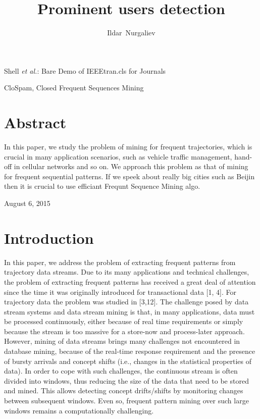 \documentclass[journal]{IEEEtran}
\begin{document}
\title{Prominent users detection}

\author{Ildar~Nurgaliev}


%
{Shell \MakeLowercase{\textit{et al.}}: Bare Demo of IEEEtran.cls for Journals}

\maketitle

\begin{IEEEkeywords}
CloSpam, Closed Frequent Sequences Mining 
\end{IEEEkeywords}

\IEEEpeerreviewmaketitle

\section{Abstract}
In this paper, we study the problem of mining for frequent trajectories, which is crucial in many application scenarios, such as vehicle traffic management, hand-off in cellular networks and so on. We approach this problem as that of mining for frequent sequential patterns. If we speek about really big cities such as Beijin then it is crucial to use efficiant Frequnt Sequence Mining algo.

\hfill August 6, 2015

\section{Introduction}
In this paper, we address the problem of extracting frequent patterns from trajectory data streams. Due to its many applications and technical challenges, the problem of extracting frequent patterns has received a great deal of attention since the time it was originally introduced for transactional data [1, 4]. For trajectory data the problem was studied in [3,12]. The challenge posed by data stream systems and data stream mining is that, in many applications, data must be processed continuously, either because of real time requirements or simply because the stream is too massive for a store-now and process-later approach. However, mining of data streams brings many challenges not encountered in database mining, because of the real-time response requirement and the presence of bursty arrivals and concept shifts (i.e., changes in the statistical properties of data). In order to cope with such challenges, the continuous stream is often divided into windows, thus reducing the size of the data that need to be stored and mined. This allows detecting concept drifts/shifts by monitoring changes between subsequent windows. Even so, frequent pattern mining over such large windows remains a computationally challenging.
\end{document}

